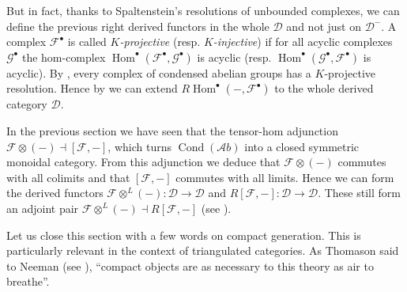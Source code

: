 \documentclass[11pt,A4]{article}
\theoremstyle{plain}
\theoremstyle{definition}
\theoremstyle{remark}
\newcommand{\1}{\mathbbm{1}}
\newcommand{\F}{\mathcal{F}}
\newcommand{\G}{\mathcal{G}}
\newcommand{\Ab}{\mathscr{A}b}
\newcommand{\D}{\mathscr{D}}
\DeclareMathOperator{\Hom}{Hom}
\DeclareMathOperator{\Cond}{Cond}
\newcommand{\ot}{\otimes}
\newcommand{\grd}{^{\bullet}}
\begin{document}
But in fact, thanks to Spaltenstein's resolutions of unbounded complexes, we can define the previous right derived functors in the whole $\D$ and not just on $\D^{-}$.
A complex $\F\grd$ is called \textit{$K$-projective} (resp. \textit{$K$-injective}) if for all acyclic complexes $\G\grd$ the hom-complex $\Hom\grd(\F\grd,\G\grd)$ is acyclic (resp. $\Hom\grd(\G\grd,\F\grd)$ is acyclic).
By \cite[Corollary 3.5]{spa88}, every complex of condensed abelian groups has a $K$-projective resolution.
Hence by \cite[\href{https://stacks.math.columbia.edu/tag/06XN}{Tag 06XN}]{sta19} we can extend $R\Hom\grd(-,\F\grd)$ to the whole derived category $\D$.

In the previous section we have seen that the tensor-hom adjunction $\F\ot (-)\dashv [\F,-]$, which turns $\Cond(\Ab)$ into a closed symmetric monoidal category.
From this adjunction we deduce that $\F\ot (-)$ commutes with all colimits and that $[\F,-]$ commutes with all limits.
Hence we can form the derived functors $\F\ot^{L}(-)\colon \D\to \D$ and $R[\F,-]\colon \D\to \D$.
These still form an adjoint pair $\F\ot^{L}(-)\dashv R[\F,-]$ (see \cite[\href{https://stacks.math.columbia.edu/tag/09T5}{Tag 09T5}]{sta19}).

Let us close this section with a few words on compact generation.
This is particularly relevant in the context of triangulated categories.
As Thomason said to Neeman (see \cite{nee01}), ``compact objects are as necessary to this theory as air to breathe''.
\end{document}

